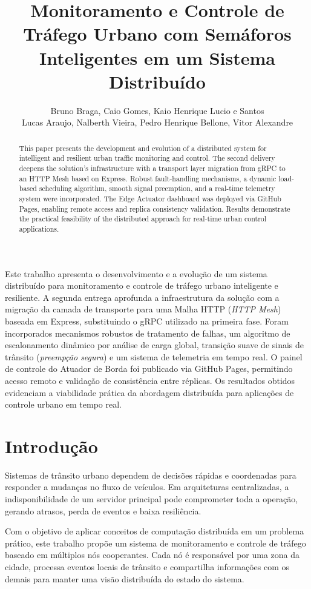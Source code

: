 \documentclass[12pt]{article}
\title{Monitoramento e Controle de Tráfego Urbano com Semáforos Inteligentes em um Sistema Distribuído}
\author{
Bruno Braga,
Caio Gomes,
Kaio Henrique Lucio e Santos \\
Lucas Araujo,
Nalberth Vieira,
Pedro Henrique Bellone,
Vitor Alexandre
}
\begin{document}
\maketitle

\begin{resumo}
Este trabalho apresenta o desenvolvimento e a evolução de um sistema distribuído para monitoramento e controle de tráfego urbano inteligente e resiliente. A segunda entrega aprofunda a infraestrutura da solução com a migração da camada de transporte para uma Malha HTTP (\textit{HTTP Mesh}) baseada em Express, substituindo o gRPC utilizado na primeira fase. Foram incorporados mecanismos robustos de tratamento de falhas, um algoritmo de escalonamento dinâmico por análise de carga global, transição suave de sinais de trânsito (\textit{preempção segura}) e um sistema de telemetria em tempo real. O painel de controle do Atuador de Borda foi publicado via GitHub Pages, permitindo acesso remoto e validação de consistência entre réplicas. Os resultados obtidos evidenciam a viabilidade prática da abordagem distribuída para aplicações de controle urbano em tempo real.
\end{resumo}

\begin{abstract}
This paper presents the development and evolution of a distributed system for intelligent and resilient urban traffic monitoring and control. The second delivery deepens the solution's infrastructure with a transport layer migration from gRPC to an HTTP Mesh based on Express. Robust fault-handling mechanisms, a dynamic load-based scheduling algorithm, smooth signal preemption, and a real-time telemetry system were incorporated. The Edge Actuator dashboard was deployed via GitHub Pages, enabling remote access and replica consistency validation. Results demonstrate the practical feasibility of the distributed approach for real-time urban control applications.
\end{abstract}

\section{Introdução}

Sistemas de trânsito urbano dependem de decisões rápidas e coordenadas para responder a mudanças no fluxo de veículos. Em arquiteturas centralizadas, a indisponibilidade de um servidor principal pode comprometer toda a operação, gerando atrasos, perda de eventos e baixa resiliência.

Com o objetivo de aplicar conceitos de computação distribuída em um problema prático, este trabalho propõe um sistema de monitoramento e controle de tráfego baseado em múltiplos nós cooperantes. Cada nó é responsável por uma zona da cidade, processa eventos locais de trânsito e compartilha informações com os demais para manter uma visão distribuída do estado do sistema.
\end{document}
